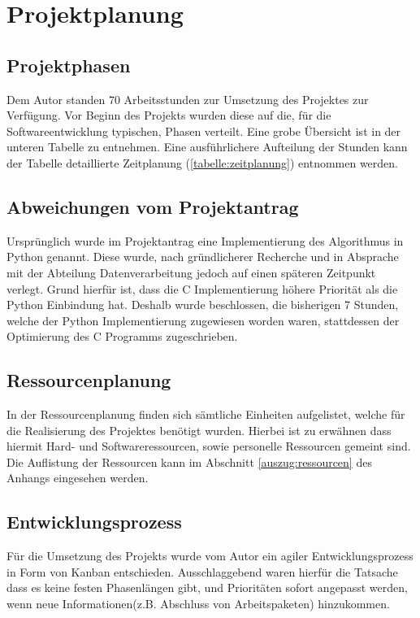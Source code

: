 \section{Projektplanung}
\subsection{Projektphasen}
Dem Autor standen 70 Arbeitsstunden zur Umsetzung des Projektes zur Verfügung.
Vor Beginn des Projekts wurden diese auf die, für die Softwareentwicklung
typischen, Phasen verteilt. Eine grobe Übersicht ist in der unteren Tabelle zu
entnehmen. Eine ausführlichere Aufteilung der Stunden kann der Tabelle
detaillierte Zeitplanung (\ref{tabelle:zeitplanung}) entnommen werden.



\subsection{Abweichungen vom Projektantrag}
Ursprünglich wurde im Projektantrag eine Implementierung des Algorithmus in
Python genannt. Diese wurde, nach gründlicherer Recherche und in Absprache mit der
Abteilung Datenverarbeitung jedoch auf einen späteren Zeitpunkt verlegt. Grund
hierfür ist, dass die C Implementierung höhere Priorität als die Python Einbindung hat.
Deshalb wurde beschlossen, die bisherigen 7 Stunden, welche der Python Implementierung
zugewiesen worden waren, stattdessen der Optimierung des C Programms zugeschrieben.

\subsection{Ressourcenplanung}
In der Ressourcenplanung finden sich sämtliche Einheiten aufgelistet, welche für
 die Realisierung des Projektes benötigt wurden. Hierbei ist zu erwähnen dass
 hiermit Hard- und Softwareressourcen, sowie personelle Ressourcen gemeint sind.
 Die Auflistung der Ressourcen kann im Abschnitt \ref{auszug:ressourcen} des Anhangs eingesehen werden.

\subsection{Entwicklungsprozess}
Für die Umsetzung des Projekts wurde vom Autor ein agiler Entwicklungsprozess in
Form von Kanban entschieden. Ausschlaggebend waren hierfür die Tatsache dass es
keine festen Phasenlängen gibt, und Prioritäten sofort angepasst werden, wenn
neue Informationen(z.B. Abschluss von Arbeitspaketen) hinzukommen.\par

